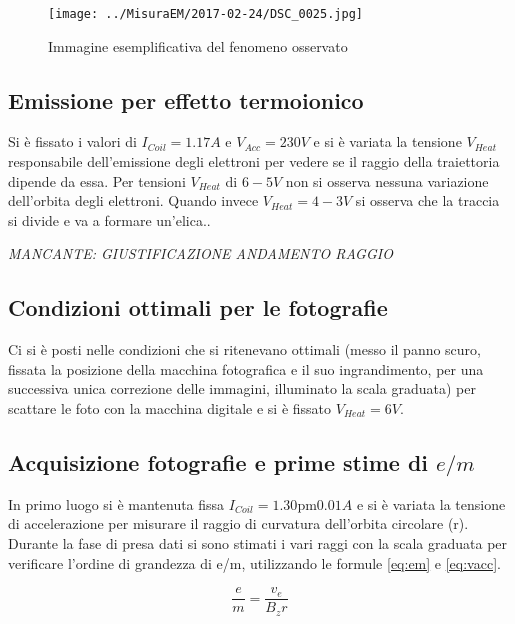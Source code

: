 \documentclass[10pt,a4paper]{article}
\begin{document}
\begin{figure}[H]
	\centering
	\texttt{[image: ../MisuraEM/2017-02-24/DSC\_0025.jpg]}
	\caption{Immagine esemplificativa del fenomeno osservato}
	\label{fig:ex1}
\end{figure}

\subsection{Emissione per effetto termoionico}

Si è fissato i valori di $I_{Coil} = \unit{1.17}{A}$ e $V_{Acc} = \unit{230}{V}$ e si è variata la tensione $V_{Heat}$ responsabile dell'emissione degli elettroni per vedere se il raggio della traiettoria dipende da essa.
Per tensioni $V_{Heat}$ di $\unit{6-5}{V}$ non si osserva nessuna variazione dell'orbita degli elettroni. Quando invece $V_{Heat} = \unit{4-3}{V}$ si osserva che la traccia si divide e va a formare un'elica..

\emph{MANCANTE: GIUSTIFICAZIONE ANDAMENTO RAGGIO}

\subsection{Condizioni ottimali per le fotografie}

Ci si è posti nelle condizioni che si ritenevano ottimali (messo il panno scuro, fissata la posizione della macchina fotografica e il suo ingrandimento, per una successiva unica correzione delle immagini, illuminato la scala graduata) per scattare le foto con la macchina digitale e si è fissato $V_{Heat} = \unit{6}{V}$.


\subsection{Acquisizione fotografie e prime stime di $e/m$}

In primo luogo si è mantenuta fissa $I_{Coil} = \unit{1.30 \pm 0.01}{A}$ e si è variata la tensione di accelerazione per misurare il raggio di curvatura dell'orbita circolare (r). Durante la fase di presa dati si sono stimati i vari raggi con la scala graduata per verificare l'ordine di grandezza di e/m, utilizzando le formule \eqref{eq:em} e \eqref{eq:vacc}. 

\begin{equation}
	\frac{e}{m} = \frac{v_e}{B_z r}
	\label{eq:em}
\end{equation}
\end{document}
